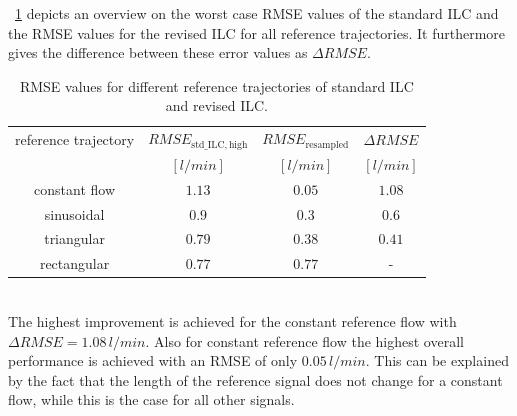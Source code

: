 \tablename~\ref{tab:compare_ILC} depicts an overview on the worst case RMSE values of the standard ILC and the RMSE values for the revised ILC for all reference trajectories. It furthermore gives the difference between these error values as $\Delta{RMSE}$.
\begin{table}[h]
  \centering
  \begin{tabular}{c|c|c|c}
    \toprule
     reference trajectory & $RMSE_{\mathrm{std\_ILC,high}}$ & $RMSE_{\mathrm{resampled}} $ & $\Delta{RMSE} $\\
     & $[l/min]$ & $[l/min]$ & $[l/min]$\\
    \midrule
    constant flow & $1.13$ & $0.05$ & $1.08$ \\
    sinusoidal & $0.9$ & $0.3$ & $0.6$ \\
    triangular & $0.79$ & $0.38$ & $0.41$ \\
    rectangular & $0.77$ & $0.77$ & - \\
    \bottomrule
\end{tabular}
  \caption[RMSE values for different reference trajectories of standard ILC and revised ILC]{RMSE values for different reference trajectories of standard ILC and revised ILC.}
  \label{tab:compare_ILC}
\end{table}
\\The highest improvement is achieved for the constant reference flow with $\Delta{RMSE}=1.08\,l/min$. Also for constant reference flow the highest overall performance is achieved with an RMSE of only $0.05\,l/min$. This can be explained by the fact that the length of the reference signal does not change for a constant flow, while this is the case for all other signals.
